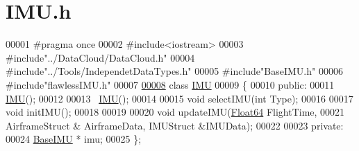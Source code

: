 \hypertarget{_i_m_u_8h_source}{}\section{I\+M\+U.\+h}
\label{_i_m_u_8h_source}

\begin{DoxyCode}
00001 \textcolor{preprocessor}{#pragma once}
00002 \textcolor{preprocessor}{#include<iostream>}
00003 \textcolor{preprocessor}{#include"../DataCloud/DataCloud.h"}
00004 \textcolor{preprocessor}{#include"../Tools/IndependetDataTypes.h"}
00005 \textcolor{preprocessor}{#include"BaseIMU.h"}
00006 \textcolor{preprocessor}{#include"flawlessIMU.h"}
00007 
\hyperlink{class_i_m_u}{00008} \textcolor{keyword}{class }\hyperlink{class_i_m_u}{IMU}
00009 \{
00010 \textcolor{keyword}{public}:
00011     \hyperlink{class_i_m_u}{IMU}();
00012 
00013     ~\hyperlink{class_i_m_u}{IMU}();
00014 
00015     \textcolor{keywordtype}{void} selectIMU(\textcolor{keywordtype}{int} Type);
00016 
00017     \textcolor{keywordtype}{void} initIMU();
00018 
00019 
00020     \textcolor{keywordtype}{void} updateIMU(\hyperlink{group___tools_ga3f1431cb9f76da10f59246d1d743dc2c}{Float64} FlightTime, 
00021                    AirframeStruct & AirframeData, IMUStruct &IMUData);
00022 
00023 \textcolor{keyword}{private}:
00024     \hyperlink{class_base_i_m_u}{BaseIMU} * imu;
00025 \};
\end{DoxyCode}
